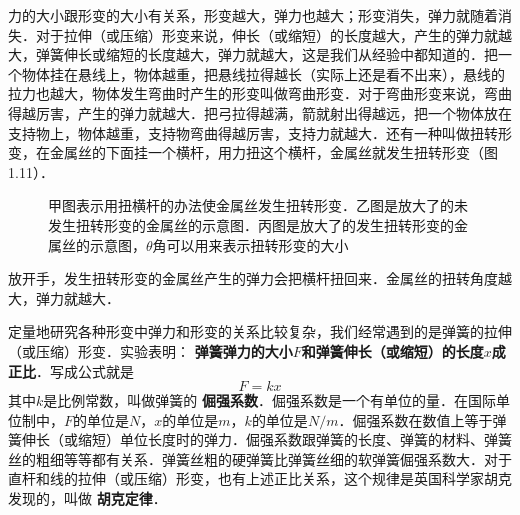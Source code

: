 力的大小跟形变的大小有关系，形变越大，弹力也越大；形变消失，弹力就随着消失．对于拉伸（或压缩）形变来说，伸长（或缩短）的长度越大，产生的弹力就越大，弹簧伸长或缩短的长度越大，弹力就越大，这是我们从经验中都知道的．把一个物体挂在悬线上，物体越重，把悬线拉得越长（实际上还是看不出来），悬线的拉力也越大，物体发生弯曲时产生的形变叫做弯曲形变．对于弯曲形变来说，弯曲得越厉害，产生的弹力就越大．把弓拉得越满，箭就射出得越远，把一个物体放在支持物上，物体越重，支持物弯曲得越厉害，支持力就越大．还有一种叫做扭转形变，在金属丝的下面挂一个横杆，用力扭这个横杆，金属丝就发生扭转形变（图1.11）．
\begin{figure}[H]
    \centering
    \qquad
    \qquad
    \caption{甲图表示用扭横杆的办法使金属丝发生扭转形变．乙图是放大了的未发生扭转形变的金属丝的示意图．丙图是放大了的发生扭转形变的金属丝的示意图，$\theta$角可以用来表示扭转形变的大小}
\end{figure}
放开手，发生扭转形变的金属丝产生的弹力会把横杆扭回来．金属丝的扭转角度越大，弹力就越大．

定量地研究各种形变中弹力和形变的关系比较复杂，我们经常遇到的是弹簧的拉伸（或压缩）形变．实验表明：\textbf{ 弹簧弹力的大小$F$和弹簧伸长（或缩短）的长度$x$成正比}．写成公式就是
\begin{equation}
    F=kx
\end{equation}
其中$k$是比例常数，叫做弹簧的\textbf{ 倔强系数}．倔强系数是一个有单位的量．在国际单位制中，$F$的单位是$\unit{N}$，$x$的单位是$\unit{m}$，$k$的单位是$\unit{N/m}$．倔强系数在数值上等于弹簧伸长（或缩短）单位长度时的弹力．倔强系数跟弹簧的长度、弹簧的材料、弹簧丝的粗细等等都有关系．弹簧丝粗的硬弹簧比弹簧丝细的软弹簧倔强系数大．对于直杆和线的拉伸（或压缩）形变，也有上述正比关系，这个规律是英国科学家胡克发现的，叫做\textbf{ 胡克定律}．


